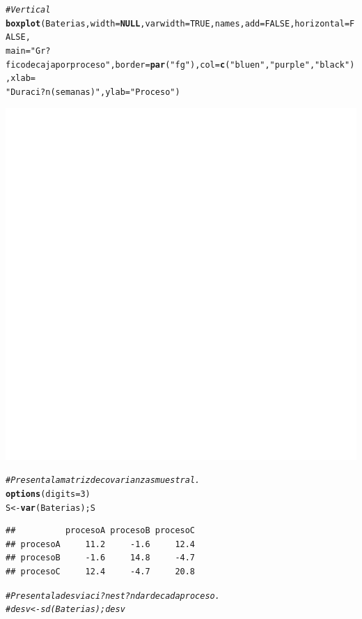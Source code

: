 \documentclass[10pt,a4paper]{article}\usepackage[]{graphicx}\usepackage[]{color}
\makeatletter
\def\maxwidth{ %
  \ifdim\Gin@nat@width>\linewidth
    \linewidth
  \else
    \Gin@nat@width
  \fi
}
\newcommand{\hlnum}[1]{\textcolor[rgb]{0.686,0.059,0.569}{#1}}%
\newcommand{\hlstr}[1]{\textcolor[rgb]{0.192,0.494,0.8}{#1}}%
\newcommand{\hlcom}[1]{\textcolor[rgb]{0.678,0.584,0.686}{\textit{#1}}}%
\newcommand{\hlstd}[1]{\textcolor[rgb]{0.345,0.345,0.345}{#1}}%
\newcommand{\hlkwa}[1]{\textcolor[rgb]{0.161,0.373,0.58}{\textbf{#1}}}%
\newcommand{\hlkwb}[1]{\textcolor[rgb]{0.69,0.353,0.396}{#1}}%
\newcommand{\hlkwc}[1]{\textcolor[rgb]{0.333,0.667,0.333}{#1}}%
\newcommand{\hlkwd}[1]{\textcolor[rgb]{0.737,0.353,0.396}{\textbf{#1}}}%
\newenvironment{kframe}{%
 \def\at@end@of@kframe{}%
 \ifinner\ifhmode%
  \def\at@end@of@kframe{\end{minipage}}%
  \begin{minipage}{\columnwidth}%
 \fi\fi%
 \def\FrameCommand##1{\hskip\@totalleftmargin \hskip-\fboxsep
 \colorbox{shadecolor}{##1}\hskip-\fboxsep
     \hskip-\linewidth \hskip-\@totalleftmargin \hskip\columnwidth}%
 \MakeFramed {\advance\hsize-\width
   \@totalleftmargin\z@ \linewidth\hsize
   \@setminipage}}%
 {\par\unskip\endMakeFramed%
 \at@end@of@kframe}
\newenvironment{knitrout}{}{} %
\makeatother
\begin{document}
\begin{knitrout}
\color{fgcolor}\begin{kframe}
\begin{alltt}
\hlcom{# Vertical }
\hlkwd{boxplot}\hlstd{(Baterias,} \hlkwc{width}\hlstd{=}\hlkwa{NULL}\hlstd{,} \hlkwc{varwidth}\hlstd{=}\hlnum{TRUE}\hlstd{,names,} \hlkwc{add}\hlstd{=} \hlnum{FALSE}\hlstd{,} \hlkwc{horizontal} \hlstd{=} \hlnum{FALSE}\hlstd{,}
\hlkwc{main}\hlstd{=}\hlstr{"Gr?fico de caja por proceso"}\hlstd{,} \hlkwc{border}\hlstd{=}\hlkwd{par}\hlstd{(}\hlstr{"fg"}\hlstd{),} \hlkwc{col}\hlstd{=}\hlkwd{c}\hlstd{(}\hlstr{"bluen"}\hlstd{,} \hlstr{"purple"}\hlstd{,} \hlstr{"black"}\hlstd{),} \hlkwc{xlab} \hlstd{=}
\hlstr{"Duraci?n (semanas)"}\hlstd{,} \hlkwc{ylab}\hlstd{=}\hlstr{"Proceso"}\hlstd{)}
\end{alltt}


{\ttfamily\noindent\bfseries{}}\end{kframe}
\includegraphics[width=\maxwidth]{figure/unnamed-chunk-8-1} 
\begin{kframe}\begin{alltt}
\hlcom{#Presenta la matriz de covarianzas muestral. }
\hlkwd{options}\hlstd{(}\hlkwc{digits}\hlstd{=}\hlnum{3}\hlstd{)}
\hlstd{S} \hlkwb{<-} \hlkwd{var}\hlstd{(Baterias); S}
\end{alltt}
\begin{verbatim}
##          procesoA procesoB procesoC
## procesoA     11.2     -1.6     12.4
## procesoB     -1.6     14.8     -4.7
## procesoC     12.4     -4.7     20.8
\end{verbatim}
\begin{alltt}
\hlcom{#Presenta la desviaci?n est?ndar de cada proceso. }
\hlcom{#desv <- sd(Baterias); desv}


\end{alltt}
\end{kframe}
\end{knitrout}
\end{document}
